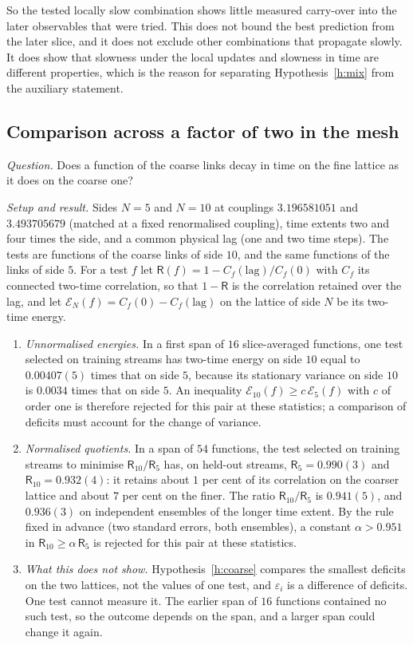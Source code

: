 So the tested locally slow combination shows little measured carry-over into the later observables that were
tried. This does not bound the best prediction from the later slice, and it does not exclude other
combinations that propagate slowly. It does show that slowness under the local updates and slowness in time
are different properties, which is the reason for separating Hypothesis~\ref{h:mix} from the auxiliary
statement.

\subsection{Comparison across a factor of two in the mesh}\label{s:cross}
\emph{Question.} Does a function of the coarse links decay in time on the fine lattice as it does on the
coarse one?

\emph{Setup and result.} Sides $N=5$ and $N=10$ at couplings $3.196581051$ and $3.493705679$ (matched at a
fixed renormalised coupling), time extents two and four times the side, and a common physical
lag (one and two time steps). The tests are functions of the coarse links of side $10$, and the same
functions of the links of side $5$. For a test $f$ let $\mathsf R(f)=1-C_f(\mathrm{lag})/C_f(0)$ with $C_f$ its
connected two-time correlation, so that $1-\mathsf R$ is the correlation retained over the lag, and let
$\mathcal E_N(f)=C_f(0)-C_f(\mathrm{lag})$ on the lattice of side $N$ be its two-time energy.
\begin{enumerate}
\item \emph{Unnormalised energies.} In a first span of $16$ slice-averaged functions, one test selected on
training streams has two-time energy on side $10$ equal to $0.00407(5)$ times that on side $5$, because its
stationary variance on side $10$ is $0.0034$ times that on side $5$. An inequality
$\mathcal E_{10}(f)\ge c\,\mathcal E_5(f)$ with $c$ of order one is therefore rejected for this pair at these
statistics; a comparison of deficits must account for the change of variance.
\item \emph{Normalised quotients.} In a span of $54$ functions, the test selected on training streams to
minimise $\mathsf R_{10}/\mathsf R_5$ has, on held-out streams, $\mathsf R_5=0.990(3)$ and
$\mathsf R_{10}=0.932(4)$: it retains about $1$ per cent of its correlation on the coarser lattice and about
$7$ per cent on the finer. The ratio $\mathsf R_{10}/\mathsf R_5$ is $0.941(5)$, and $0.936(3)$ on independent
ensembles of the longer time extent. By the rule fixed in advance (two standard errors, both ensembles), a
constant $\alpha>0.951$ in $\mathsf R_{10}\ge\alpha\,\mathsf R_5$ is rejected for this pair at these statistics.
\item \emph{What this does not show.} Hypothesis~\ref{h:coarse} compares the smallest deficits on the two
lattices, not the values of one test, and $\varepsilon_i$ is a difference of deficits. One test cannot measure
it. The earlier span of $16$ functions contained no such test, so the outcome depends on the span, and a
larger span could change it again.
\end{enumerate}

